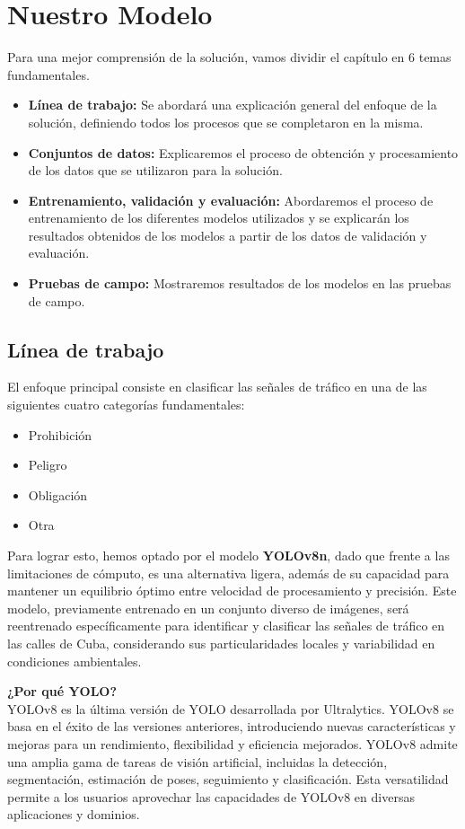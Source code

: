 \documentclass{article}
\begin{document}


\section{Nuestro Modelo}
Para una mejor comprensión de la solución, vamos dividir el capítulo en 6 temas fundamentales.\\
\begin{itemize}
\item{\textbf{Línea de trabajo:} Se abordará una explicación general del enfoque de la solución, definiendo todos los procesos que se completaron en la misma.}
\item{\textbf{Conjuntos de datos:} Explicaremos el proceso de obtención y procesamiento de los datos que se utilizaron para la solución.}
\item{\textbf{Entrenamiento, validación y evaluación:} Abordaremos el proceso de entrenamiento de los diferentes modelos utilizados y se explicarán los resultados obtenidos de los modelos a partir de los datos de validación y evaluación.}
\item{\textbf{Pruebas de campo:} Mostraremos resultados de los modelos en las pruebas de campo.}
\end{itemize}
\subsection{Línea de trabajo}
El enfoque principal consiste en clasificar las señales de tráfico en una de las siguientes cuatro categorías fundamentales: 
\begin{itemize}
\item{Prohibición}
\item{Peligro}
\item{Obligación}
\item{Otra}
\end{itemize}
Para lograr esto, hemos optado por el modelo \textbf{YOLOv8n}, dado que frente a las limitaciones de cómputo, es una alternativa ligera, además de su capacidad para mantener un equilibrio óptimo entre velocidad de procesamiento y precisión. Este modelo, previamente entrenado en un conjunto diverso de imágenes, será reentrenado específicamente para identificar y clasificar las señales de tráfico en las calles de Cuba, considerando sus particularidades locales y variabilidad en condiciones ambientales.

\begin{tcolorbox}
\textbf{¿Por qué YOLO?}\\
YOLOv8 es la última versión de YOLO desarrollada por Ultralytics. YOLOv8 se basa en el éxito de las versiones anteriores, introduciendo nuevas características y mejoras para un rendimiento, flexibilidad y eficiencia mejorados. YOLOv8 admite una amplia gama de tareas de visión artificial, incluidas la detección, segmentación, estimación de poses, seguimiento y clasificación. Esta versatilidad permite a los usuarios aprovechar las capacidades de YOLOv8 en diversas aplicaciones y dominios.
\end{tcolorbox}
\end{document}

